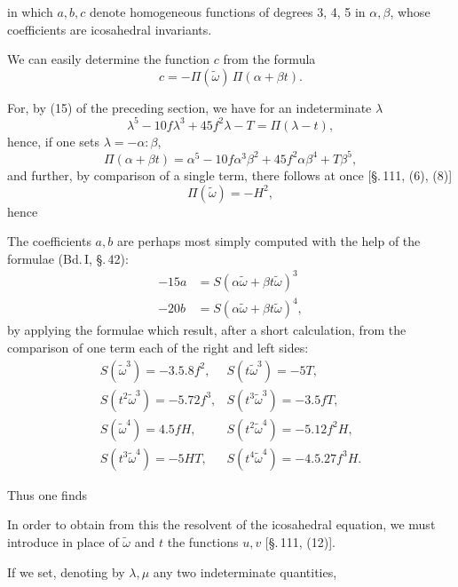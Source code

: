 
in which $a, b, c$ denote homogeneous functions of degrees 3, 4, 5 in $\alpha, \beta$, whose coefficients are icosahedral invariants.

We can easily determine the function $c$ from the formula
\[ c = -\Pi(\tilde\omega)\,\Pi(\alpha + \beta t). \]

For, by (15) of the preceding section, we have for an indeterminate $\lambda$
\[ \lambda^5 - 10f\lambda^3 + 45f^2\lambda - T = \Pi(\lambda - t), \]
hence, if one sets $\lambda = -\alpha : \beta$,
\[ \Pi(\alpha + \beta t) = \alpha^5 - 10f\alpha^3\beta^2 + 45f^2\alpha\beta^4 + T\beta^5, \]
and further, by comparison of a single term, there follows at once [\S.\,111, (6), (8)]
\[ \Pi(\tilde\omega) = -H^2, \]
hence

The coefficients $a, b$ are perhaps most simply computed with the help of the  formulae (Bd.\,I, \S.\,42):
\[
\begin{aligned}
-15a &= S(\alpha\tilde\omega + \beta t\tilde\omega)^3\\
-20b &= S(\alpha\tilde\omega + \beta t\tilde\omega)^4,
\end{aligned}
\]
by applying the formulae which result, after a short calculation, from the comparison of one term each of the right and left sides:
\[
\begin{array}{ll}
S(\tilde\omega^3) = -3.5.8f^2, & S(t\tilde\omega^3) = -5T,\\
S(t^2\tilde\omega^3) = -5.72f^3, & S(t^3\tilde\omega^3) = -3.5fT,\\
S(\tilde\omega^4) = 4.5fH, & S(t^2\tilde\omega^4) = -5.12f^2H,\\
S(t^3\tilde\omega^4) = -5HT, & S(t^4\tilde\omega^4) = -4.5.27f^3H.
\end{array}
\]

Thus one finds

In order to obtain from this the resolvent of the icosahedral equation, we must introduce in place of $\tilde\omega$ and $t$ the functions $u, v$ [\S.\,111, (12)].

If we set, denoting by $\lambda, \mu$ any two indeterminate quantities,
